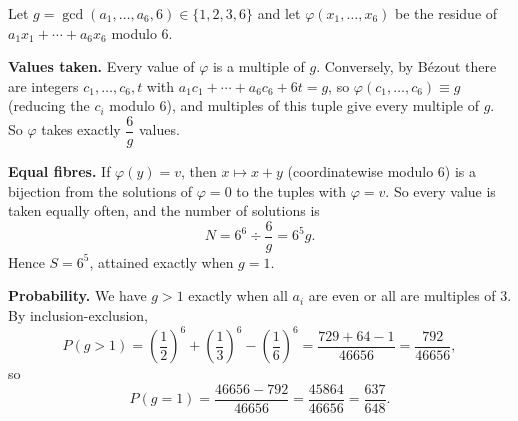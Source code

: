 Let $g=\gcd(a_1,\dots,a_6,6)\in\{1,2,3,6\}$ and let $\varphi(x_1,\dots,x_6)$ be the residue of $a_1x_1+\cdots+a_6x_6$ modulo $6$.

\textbf{Values taken.} Every value of $\varphi$ is a multiple of $g$. Conversely, by B\'ezout there are integers $c_1,\dots,c_6,t$ with $a_1c_1+\cdots+a_6c_6+6t=g$, so $\varphi(c_1,\dots,c_6)\equiv g$ (reducing the $c_i$ modulo $6$), and multiples of this tuple give every multiple of $g$. So $\varphi$ takes exactly $\dfrac{6}{g}$ values.

\textbf{Equal fibres.} If $\varphi(y)=v$, then $x\mapsto x+y$ (coordinatewise modulo $6$) is a bijection from the solutions of $\varphi=0$ to the tuples with $\varphi=v$. So every value is taken equally often, and the number of solutions is
\[
N=6^6\div\dfrac{6}{g}=6^5g .
\]
Hence $S=6^5$, attained exactly when $g=1$.

\textbf{Probability.} We have $g>1$ exactly when all $a_i$ are even or all are multiples of $3$. By inclusion-exclusion,
\[
P(g>1)=\left(\dfrac{1}{2}\right)^6+\left(\dfrac{1}{3}\right)^6-\left(\dfrac{1}{6}\right)^6=\dfrac{729+64-1}{46656}=\dfrac{792}{46656},
\]
so
\[
P(g=1)=\dfrac{46656-792}{46656}=\dfrac{45864}{46656}=\boxed{\dfrac{637}{648}}.
\]
